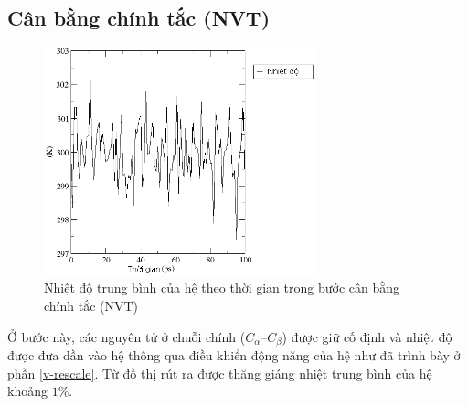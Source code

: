\documentclass[12pt,a4paper,reqno, oneside]{book}
\begin{document}
	\subsection{Cân bằng chính tắc (NVT)}
	\begin{figure}[h]
	\centering
	\includegraphics[width=0.7\textwidth,natwidth=610,natheight=642]{25temperature}
	\caption{Nhiệt độ trung bình của hệ theo thời gian trong bước cân bằng chính tắc (NVT)}
	\label{fig:nvt}
	\end{figure}
	Ở bước này, các nguyên tử ở chuỗi chính ($C_{\alpha}$--$C_{\beta}$) được giữ cố định và nhiệt độ được đưa dần vào hệ thông qua điều khiển động năng của hệ như đã trình bày ở phần \ref{v-rescale}. Từ đồ thị rút ra được thăng giáng nhiệt trung bình của hệ khoảng $1\%$.
\end{document}

